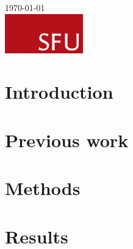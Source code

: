 \begin{titlepage}


		{\large \today}\\[2cm] %


		\includegraphics{SFUlogo.png}\\[1cm] %


		\vfill %

	\end{titlepage}

	\begin{abstract}

	\end{abstract}

	\section{Introduction}

	\section{Previous work}

	\section{Methods}

	\section{Results}


